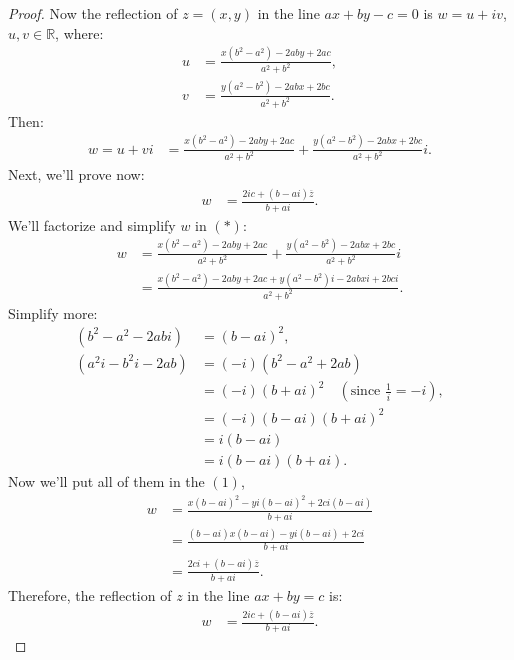             \begin{proof}
                Now the reflection of $z = (x, y)$ in the line $ax + by - c = 0$ is $w = u + iv$, $u, v \in \mathbb{R}$, where:
                \begin{align*}
                u &= \frac{x(b^2 - a^2) - 2aby + 2ac}{a^2 + b^2}, \\
                v &= \frac{y(a^2 - b^2) - 2abx + 2bc}{a^2 + b^2}.
                \end{align*}
                Then:
                \begin{align*}
                w = u + vi &= \frac{x(b^2 - a^2) - 2aby + 2ac}{a^2 + b^2} + \frac{y(a^2 - b^2) - 2abx + 2bc}{a^2 + b^2}i. 
                \end{align*}
                Next, we'll prove now:
                \begin{align*}
                w &= \frac{2ic + (b - ai)\overline{z}}{b + ai}.
                \end{align*}
                We'll factorize and simplify $w$ in $(*)$:
                \begin{align*}
                w &= \frac{x(b^2 - a^2) - 2aby + 2ac}{a^2 + b^2} + \frac{y(a^2 - b^2) - 2abx + 2bc}{a^2 + b^2}i \\
                &= \frac{x(b^2 - a^2) - 2aby + 2ac + y(a^2 - b^2)i - 2abxi + 2bci}{a^2 + b^2}.
                \end{align*}
                Simplify more:
                \begin{align*}
                (b^2 - a^2 - 2abi) &= (b - ai)^2, \\
                (a^2i - b^2i - 2ab) &= (-i)(b^2 - a^2 + 2ab) \\
                &= (-i)(b + ai)^2 \quad \left(\text{since } \frac{1}{i} = -i\right), \\
                &= (-i)(b - ai)(b + ai)^2 \\
                &= i(b - ai) \\
                &= i(b - ai)(b + ai).
                \end{align*}
                Now we'll put all of them in the $(1)$,
                \begin{align*}
                w &= \frac{x(b - ai)^2 - yi(b - ai)^2 + 2ci(b - ai)}{b + ai} \\
                &= \frac{(b - ai)x(b - ai) - yi(b - ai) + 2ci}{b + ai} \\
                &= \frac{2ci + (b - ai)\overline{z}}{b + ai}.
                \end{align*}
                Therefore, the reflection of $z$ in the line $ax + by = c$ is:
                \begin{align*}
                w &= \frac{2ic + (b - ai)\overline{z}}{b + ai}.
                \end{align*}
                \end{proof}
               
